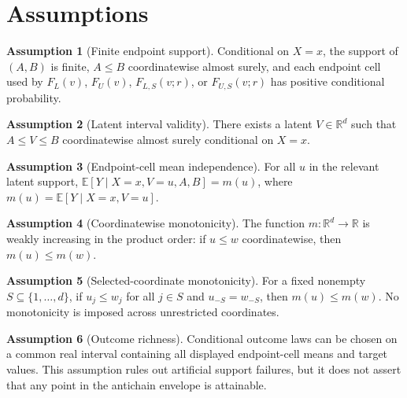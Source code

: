 \documentclass[11pt]{article}
\newcommand{\E}{\mathbb{E}}
\newcommand{\R}{\mathbb{R}}
\theoremstyle{definition}
\newtheorem{assumption}{Assumption}
\theoremstyle{plain}
\theoremstyle{remark}
\begin{document}
\section{Assumptions}
\begin{assumption}[Finite endpoint support]\label{ass:finite-support}
Conditional on \(X=x\), the support of \((A,B)\) is finite, \(A\le B\) coordinatewise almost surely, and each endpoint cell used by \(F_L(v)\), \(F_U(v)\), \(F_{L,S}(v;r)\), or \(F_{U,S}(v;r)\) has positive conditional probability.
\end{assumption}

\begin{assumption}[Latent interval validity]\label{ass:interval}
There exists a latent \(V\in\R^d\) such that \(A\le V\le B\) coordinatewise almost surely conditional on \(X=x\).
\end{assumption}

\begin{assumption}[Endpoint-cell mean independence]\label{ass:mean-independence}
For all \(u\) in the relevant latent support, \(\E[Y\mid X=x,V=u,A,B]=m(u)\), where \(m(u)=\E[Y\mid X=x,V=u]\).
\end{assumption}

\begin{assumption}[Coordinatewise monotonicity]\label{ass:coordinate-monotone}
The function \(m:\R^d\to\R\) is weakly increasing in the product order: if \(u\le w\) coordinatewise, then \(m(u)\le m(w)\).
\end{assumption}

\begin{assumption}[Selected-coordinate monotonicity]\label{ass:selected-monotone}
For a fixed nonempty \(S\subseteq\{1,\ldots,d\}\), if \(u_j\le w_j\) for all \(j\in S\) and \(u_{-S}=w_{-S}\), then \(m(u)\le m(w)\).  No monotonicity is imposed across unrestricted coordinates.
\end{assumption}

\begin{assumption}[Outcome richness]\label{ass:richness}
Conditional outcome laws can be chosen on a common real interval containing all displayed endpoint-cell means and target values.  This assumption rules out artificial support failures, but it does not assert that any point in the antichain envelope is attainable.
\end{assumption}
\end{document}
